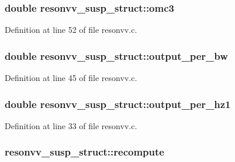 \subsubsection[{\texorpdfstring{omc3}{omc3}}]{\setlength{\rightskip}{0pt plus 5cm}double resonvv\+\_\+susp\+\_\+struct\+::omc3}\hypertarget{structresonvv__susp__struct_ae3a929efd985dfc0294128933061a01b}{}\label{structresonvv__susp__struct_ae3a929efd985dfc0294128933061a01b}


Definition at line 52 of file resonvv.\+c.

\subsubsection[{\texorpdfstring{output\+\_\+per\+\_\+bw}{output_per_bw}}]{\setlength{\rightskip}{0pt plus 5cm}double resonvv\+\_\+susp\+\_\+struct\+::output\+\_\+per\+\_\+bw}\hypertarget{structresonvv__susp__struct_a0c576e14fd505d51dfb2e1b7f3072f9a}{}\label{structresonvv__susp__struct_a0c576e14fd505d51dfb2e1b7f3072f9a}


Definition at line 45 of file resonvv.\+c.

\subsubsection[{\texorpdfstring{output\+\_\+per\+\_\+hz1}{output_per_hz1}}]{\setlength{\rightskip}{0pt plus 5cm}double resonvv\+\_\+susp\+\_\+struct\+::output\+\_\+per\+\_\+hz1}\hypertarget{structresonvv__susp__struct_ad507bac15f707cba825f4023df539d52}{}\label{structresonvv__susp__struct_ad507bac15f707cba825f4023df539d52}


Definition at line 33 of file resonvv.\+c.

\subsubsection[{\texorpdfstring{recompute}{recompute}}]{ resonvv\+\_\+susp\+\_\+struct\+::recompute}\hypertarget{structresonvv__susp__struct_a43427b950ce219645aec4a68f19f02af}{}\label{structresonvv__susp__struct_a43427b950ce219645aec4a68f19f02af}


